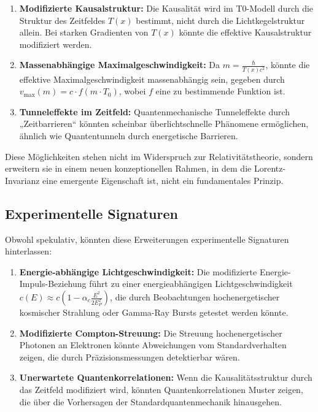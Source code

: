 \documentclass[12pt,a4paper]{article}
\newcommand{\Tfield}{T(x)}
\newcommand{\Tzero}{T_0}
\begin{document}
	\begin{enumerate}
		\item \textbf{Modifizierte Kausalstruktur:} Die Kausalität wird im T0-Modell durch die Struktur des Zeitfeldes \(\Tfield\) bestimmt, nicht durch die Lichtkegelstruktur allein. Bei starken Gradienten von \(\Tfield\) könnte die effektive Kausalstruktur modifiziert werden.
		\item \textbf{Massenabhängige Maximalgeschwindigkeit:} Da \(m = \frac{\hbar}{\Tfield c^2}\), könnte die effektive Maximalgeschwindigkeit massenabhängig sein, gegeben durch \(v_{\text{max}}(m) = c \cdot f(m \cdot \Tzero)\), wobei \(f\) eine zu bestimmende Funktion ist.
		\item \textbf{Tunneleffekte im Zeitfeld:} Quantenmechanische Tunneleffekte durch „Zeitbarrieren“ könnten scheinbar überlichtschnelle Phänomene ermöglichen, ähnlich wie Quantentunneln durch energetische Barrieren.
	\end{enumerate}
	
	Diese Möglichkeiten stehen nicht im Widerspruch zur Relativitätstheorie, sondern erweitern sie in einem neuen konzeptionellen Rahmen, in dem die Lorentz-Invarianz eine emergente Eigenschaft ist, nicht ein fundamentales Prinzip.
	
	\subsection{Experimentelle Signaturen}
	
	Obwohl spekulativ, könnten diese Erweiterungen experimentelle Signaturen hinterlassen:
	
	\begin{enumerate}
		\item \textbf{Energie-abhängige Lichtgeschwindigkeit:} Die modifizierte Energie-Impuls-Beziehung führt zu einer energieabhängigen Lichtgeschwindigkeit \(c(E) \approx c (1 - \alpha_c \frac{E^2}{2E_P^2})\), die durch Beobachtungen hochenergetischer kosmischer Strahlung oder Gamma-Ray Bursts getestet werden könnte.
		\item \textbf{Modifizierte Compton-Streuung:} Die Streuung hochenergetischer Photonen an Elektronen könnte Abweichungen vom Standardverhalten zeigen, die durch Präzisionsmessungen detektierbar wären.
		\item \textbf{Unerwartete Quantenkorrelationen:} Wenn die Kausalitätsstruktur durch das Zeitfeld modifiziert wird, könnten Quantenkorrelationen Muster zeigen, die über die Vorhersagen der Standardquantenmechanik hinausgehen.
	\end{enumerate}
	
\end{document}
